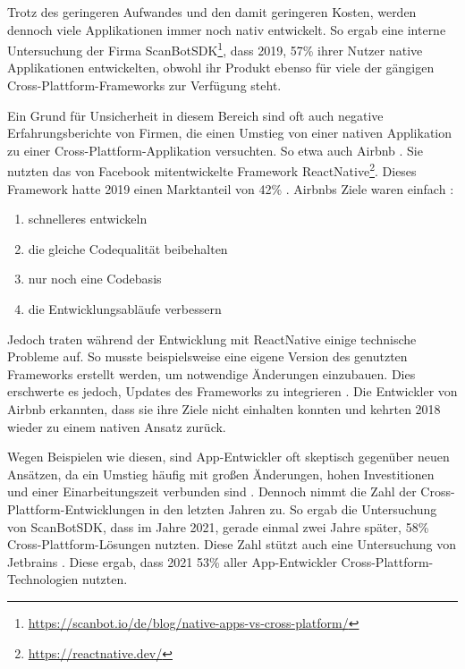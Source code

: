 Trotz des geringeren Aufwandes und den damit geringeren Kosten, werden dennoch viele Applikationen immer noch nativ entwickelt. So ergab eine interne Untersuchung der Firma ScanBotSDK\footnote{\label{scanbot_footnote}\url{https://scanbot.io/de/blog/native-apps-vs-cross-platform/}}, dass 2019, 57\% ihrer Nutzer native Applikationen entwickelten, obwohl ihr Produkt ebenso für viele der gängigen Cross-Plattform-Frameworks zur Verfügung steht.

Ein Grund für Unsicherheit in diesem Bereich sind oft auch negative Erfahrungsberichte von Firmen, die einen Umstieg von einer nativen Applikation zu einer Cross-Plattform-Applikation versuchten. So etwa auch Airbnb \cite{Airbnb_react_goals}. Sie nutzten das von Facebook mitentwickelte Framework ReactNative\footnote{\url{https://reactnative.dev/}}. Dieses Framework hatte 2019 einen Marktanteil von 42\% \cite{statist_CP_Framework}. 
\break
Airbnbs Ziele waren einfach \cite{statist_CP_Framework}:
\begin{enumerate}%
    \item schnelleres entwickeln
    \item die gleiche Codequalität beibehalten
    \item nur noch eine Codebasis
    \item die Entwicklungsabläufe verbessern
\end{enumerate}
\nointerlineskip
Jedoch traten während der Entwicklung mit ReactNative einige technische Probleme auf. So musste beispielsweise eine eigene Version des genutzten Frameworks erstellt werden, um notwendige Änderungen einzubauen. Dies erschwerte es jedoch, Updates des Frameworks zu integrieren \cite{Airbnb_technology}. Die Entwickler von Airbnb erkannten, dass sie ihre Ziele nicht einhalten konnten und kehrten 2018 wieder zu einem nativen Ansatz zurück.

Wegen Beispielen wie diesen, sind App-Entwickler oft skeptisch gegenüber neuen Ansätzen, da ein Umstieg häufig mit großen Änderungen, hohen Investitionen und einer Einarbeitungszeit verbunden sind \cite{medium_Lehtimäki}. Dennoch nimmt die Zahl der Cross-Plattform-Entwicklungen in den letzten Jahren zu. 
So ergab die Untersuchung von ScanBotSDK, dass im Jahre 2021, gerade einmal zwei Jahre später, 58\% Cross-Plattform-Lösungen nutzten. Diese Zahl stützt auch eine Untersuchung von Jetbrains \cite{JetBrains_miscellaneous_2021}. Diese ergab, dass 2021 53\% aller App-Entwickler Cross-Plattform-Technologien nutzten.

